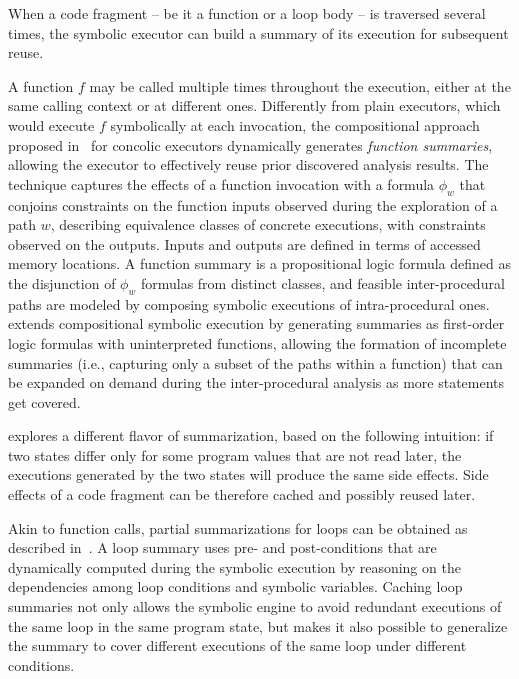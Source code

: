 When a code fragment -- be it a function or a loop body --  is traversed several times, the symbolic executor can build a summary of its execution for subsequent reuse.

A function $f$ may be called multiple times throughout the execution, either at the same calling context or at different ones. Differently from plain executors, which would execute $f$ symbolically at each invocation, the compositional approach proposed in~\cite{G-POPL07} for concolic executors dynamically generates {\em function summaries}, allowing the executor to effectively reuse prior discovered analysis results. The technique captures the effects of a function invocation with a formula $\phi_w$ that conjoins constraints on the function inputs observed during the exploration of a path $w$, describing equivalence classes of concrete executions, with constraints observed on the outputs. Inputs and outputs are defined in terms of accessed memory locations.
A function summary is a propositional logic formula defined as the disjunction of $\phi_w$ formulas from distinct classes, and feasible inter-procedural paths are modeled by composing symbolic executions of intra-procedural ones.
%
\cite{AGT-TACAS08} extends compositional symbolic execution by generating summaries as first-order logic formulas with uninterpreted functions, allowing the formation of incomplete summaries (i.e., capturing only a subset of the paths within a function) that can be expanded on demand during the inter-procedural analysis as more statements get covered. 

\cite{BCE-TACAS08} explores a different flavor of summarization, based on the following intuition: if two states differ only for some program values that are not read later, the executions generated by the two states will produce the same side effects. Side effects of a code fragment can be therefore cached and possibly reused later.

Akin to function calls, partial summarizations for loops can be obtained as described in~\cite{GL-ISSTA11}. A loop summary uses pre- and post-conditions that are dynamically computed  during the symbolic execution by reasoning on the dependencies among loop conditions and symbolic variables. Caching loop summaries not only allows the symbolic engine to avoid redundant executions of the same loop in the same program state, but  makes it also possible to generalize the summary to cover different executions of the same loop under different conditions. 


